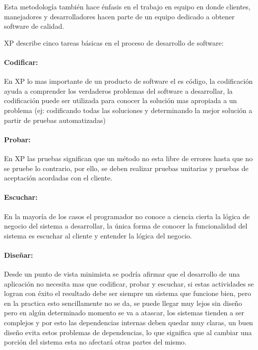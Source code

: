 Esta metodología también hace énfasis en el trabajo en equipo en donde clientes, manejadores y desarrolladores hacen parte de un equipo dedicado a obtener software de calidad.

XP describe cinco tareas básicas en el proceso de desarrollo de software:

\paragraph{Codificar:} En XP lo mas importante de un producto de software el es código, la codificación ayuda a comprender los verdaderos problemas del software a desarrollar, la codificación puede ser utilizada para conocer la solución mas apropiada a un problema (ej: codificando todas las soluciones y determinando la mejor solución a partir de pruebas automatizadas)

\paragraph{Probar:} En XP las pruebas significan que un método no esta libre de errores hasta que no se pruebe lo contrario, por ello, se deben realizar pruebas unitarias y pruebas de aceptación acordadas con el cliente.

\paragraph{Escuchar:} En la mayoría de los casos el programador no conoce a ciencia cierta la lógica de negocio del sistema a desarrollar, la única forma de conocer la funcionalidad del sistema es escuchar al cliente y entender la lógica del negocio.

\paragraph{Diseñar:} Desde un punto de vista minimista se podría afirmar que el desarrollo de una aplicación no necesita mas que codificar, probar y escuchar, si estas actividades se logran con éxito el resultado debe ser siempre un sistema que funcione bien, pero en la practica esto sencillamente no se da, se puede llegar muy lejos sin diseño pero en algún determinado momento se va a atascar, los sistemas tienden a ser complejos y por esto las dependencias internas deben quedar muy claras, un buen diseño evita estos problemas de dependencias, lo que significa que al cambiar una porción del sistema esta no afectará otras partes del mismo.

